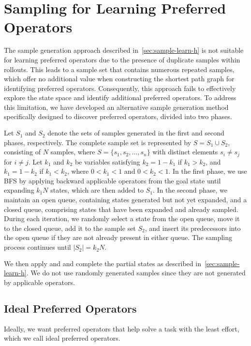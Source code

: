 \documentclass[ppgc,diss,english]{iiufrgs}
\newcommand{\ppi}[2][inline]{\todo[color=purple!50,linecolor={purple!100},#1,fancyline,author=Pedro]{#2}}
\begin{document}
\section{Sampling for Learning Preferred Operators}
\label{sec:sample-learn-po}
The sample generation approach described in~\cref{sec:sample-learn-h} is not suitable for learning preferred operators due to the presence of duplicate samples within rollouts. This leads to a sample set that contains numerous repeated samples, which offer no additional value when constructing the shortest path graph for identifying preferred operators. Consequently, this approach fails to effectively explore the state space and identify additional preferred operators. To address this limitation, we have developed an alternative sample generation method specifically designed to discover preferred operators, divided into two phases.

Let $S_1$ and $S_2$ denote the sets of samples generated in the first and second phases, respectively. The complete sample set is represented by $S = S_1 \cup S_2$, consisting of $N$ samples, where $S = \{ s_1, s_2, \ldots, s_n\}$ with distinct elements $s_i \neq s_j$ for $i \neq j$. Let $k_1$ and $k_2$ be variables satisfying $k_2 = 1 - k_1$ if $k_1 > k_2$, and $k_1 = 1 - k_2$ if $k_1 < k_2$, where $0 < k_1 < 1$ and $0 < k_2 < 1$.
In the first phase, we use BFS by applying backward applicable operators from the goal state until expanding $k_1N$ states, which are then added to $S_1$.
In the second phase, we maintain an open queue, containing states generated but not yet expanded, and a closed queue, comprising states that have been expanded and already sampled. During each iteration, we randomly select a state from the open queue, move it to the closed queue, add it to the sample set $S_2$, and insert its predecessors into the open queue if they are not already present in either queue. The sampling process continues until $|S_2| = k_2N$.

\ppi{Add pseudocode.}

We then apply \sai and \sui and complete the partial states as described in~\cref{sec:sample-learn-h}. We do not use randomly generated samples since they are not generated by applicable operators.

\subsection{Ideal Preferred Operators}
\label{sec:sample-ideal-po}
Ideally, we want preferred operators that help solve a task with the least effort, which we call ideal preferred operators.
\end{document}
